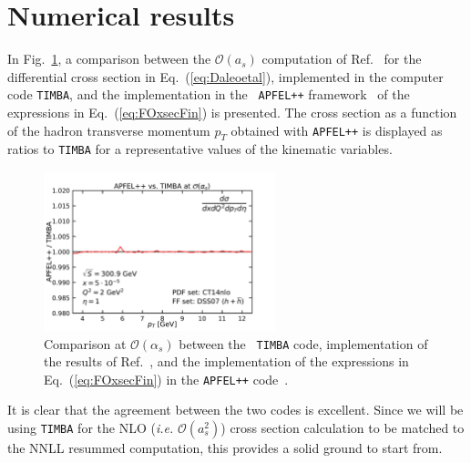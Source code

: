 \documentclass[10pt,a4paper]{article}
\begin{document}
\section{Numerical results}

In Fig.~\ref{fig:APFELvsTIMBA}, a comparison between the
$\mathcal{O}(a_s)$ computation of Ref.~\cite{Daleo:2004pn} for the
differential cross section in Eq.~(\ref{eq:Daleoetal}), implemented in
the computer code {\tt TIMBA}, and the implementation in the {\tt
  APFEL++} framework~\cite{Bertone:2017gds} of the expressions in
Eq.~(\ref{eq:FOxsecFin}) is presented. The cross section as a function
of the hadron transverse momentum $p_T$ obtained with {\tt APFEL++} is
displayed as ratios to {\tt TIMBA} for a representative values of the
kinematic variables.
\begin{figure}[t]
  \begin{centering}
    \includegraphics[width=0.6\textwidth]{../plots/APFELvsTIMBA}
    \caption{Comparison at $\mathcal{O}(\alpha_s)$ between the {\tt
        TIMBA} code, implementation of the results of
      Ref.~\cite{Daleo:2004pn}, and the implementation of the
      expressions in Eq.~(\ref{eq:FOxsecFin}) in the {\tt APFEL++}
      code~\cite{Bertone:2017gds}.\label{fig:APFELvsTIMBA}}
  \end{centering}
\end{figure}
It is clear that the agreement between the two codes is
excellent. Since we will be using {\tt TIMBA} for the NLO
(\textit{i.e.} $\mathcal{O}(a_s^2)$) cross section calculation to be
matched to the NNLL resummed computation, this provides a solid ground
to start from.
\end{document}
